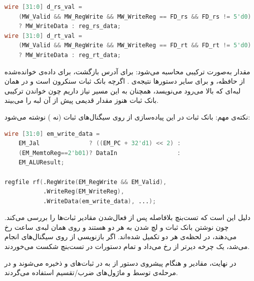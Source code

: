 \vspace{0.2cm}
\begin{latin}
    \begin{lstlisting}[language=Verilog]
wire [31:0] d_rs_val =
    (MW_Valid && MW_RegWrite && MW_WriteReg == FD_rs && FD_rs != 5'd0)
    ? MW_WriteData : reg_rs_data;
wire [31:0] d_rt_val =
    (MW_Valid && MW_RegWrite && MW_WriteReg == FD_rt && FD_rt != 5'd0)
    ? MW_WriteData : reg_rt_data;
    \end{lstlisting}
\end{latin}
\vspace{0.2cm}

مقدار  به‌صورت ترکیبی محاسبه می‌شود: برای  آدرس بازگشت، برای  داده‌ی خوانده‌شده از حافظه، و برای سایر دستورها نتیجه‌ی . اگرچه بانک ثبات سنکرون است و در همان لبه‌ای که  بالا می‌رود می‌نویسد، همچنان به این مسیر نیاز داریم چون خواندن ترکیبی بانک ثبات هنوز مقدار قدیمی پیش از آن لبه را می‌بیند.

نکته‌ی مهم: بانک ثبات در این پیاده‌سازی از روی سیگنال‌های ثبات  (نه ) نوشته می‌شود:

\vspace{0.2cm}
\begin{latin}
    \begin{lstlisting}[language=Verilog]
wire [31:0] em_write_data =
    EM_Jal              ? ((EM_PC + 32'd1) << 2) :
    (EM_MemtoReg==2'b01)? DataIn                 :
    EM_ALUResult;

regfile rf(.RegWrite(EM_RegWrite && EM_Valid),
           .WriteReg(EM_WriteReg),
           .WriteData(em_write_data), ...);
    \end{lstlisting}
\end{latin}
\vspace{0.2cm}

دلیل این است که تست‌بنچ بلافاصله پس از فعال‌شدن  مقادیر ثبات‌ها را بررسی می‌کند. چون نوشتن بانک ثبات و لچ شدن  به  هر دو  هستند و روی همان لبه‌ی ساعت رخ می‌دهند، در لحظه‌ی  هر دو تکمیل شده‌اند. اگر بازنویسی از روی سیگنال‌های  انجام می‌شد، یک چرخه دیرتر از  رخ می‌داد و تمام دستورات در تست‌بنچ شکست می‌خوردند.

در نهایت، مقادیر  و  هنگام پیشروی دستور از  به  در ثبات‌های  و  ذخیره می‌شوند و در مرحله‌ی  توسط  و ماژول‌های ضرب/تقسیم استفاده می‌گردند.


